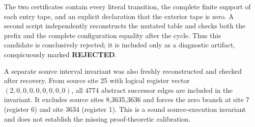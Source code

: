 The two certificates contain every literal transition, the complete finite
support of each entry tape, and an explicit declaration that the exterior tape
is zero. A second script independently reconstructs the mutated table and
checks both the prefix and the complete configuration equality after the
cycle. Thus this candidate is conclusively rejected; it is included only as a
diagnostic artifact, conspicuously marked \textbf{REJECTED}.

A separate source interval invariant was also freshly reconstructed and
checked after recovery. From source site 25 with logical register vector
$(2,0,0,0,0,0,0,0,0)$, all 4774 abstract successor edges are included in the
invariant. It excludes source sites 8,3635,3636 and forces the zero branch at
site 7 (register 6) and site 3634 (register 1). This is a sound source-execution
invariant and does not establish the missing proof-theoretic calibration.
